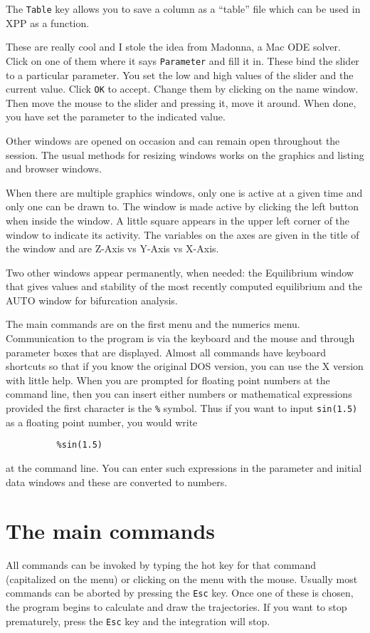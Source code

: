 \documentclass{article}
\newcommand{\bvb}{\begin{verbatim}}
\newcommand{\tcc}[1]{\addcontentsline{toc}{subsubsection}{#1}}
\begin{document}
The {\tt Table} key allows you to save a column as a ``table'' file
which can be used in XPP as a function.  

\tcc{Parameter sliders}  These are really cool and I stole the idea
from Madonna, a Mac ODE solver. Click on one of them where it says
{\tt Parameter} and fill it in.  These bind the slider to a particular
parameter.  You set the low and high values of the slider and the
current value.  Click {\tt OK} to accept. Change them by clicking on
the name window.  Then move the mouse to the slider and pressing it,
move it around.  When done, you have set the parameter to the
indicated value.


Other windows are opened on occasion and can remain open throughout the
 session.  The usual methods for resizing windows works on the graphics and
 listing and browser windows.

When there are multiple graphics windows, only one is active at a given time
 and only one can be drawn to.  The window is made active by clicking the
 left button when inside the window.  A little square appears in the upper left
 corner of the window to indicate its activity.  The variables on the
 axes are given in the title of the window and are Z-Axis vs Y-Axis vs X-Axis.  


Two other windows appear permanently, when needed: the Equilibrium window
 that gives values and stability of the most recently computed
 equilibrium and the AUTO window for bifurcation analysis.


The main commands are on the first menu and the numerics menu.  Communication 
to the program is via the keyboard and the mouse and through parameter boxes
 that are displayed.  Almost all commands have keyboard shortcuts so that if
 you know the original DOS version, you can use the X version with little help.  
When you are prompted for floating point numbers at the command line, then 
you can insert either numbers or mathematical expressions provided the first
 character is the {\tt \%} symbol. Thus if you want to input {\tt sin(1.5)} as a floating 
point number, you would write
\bvb
          %sin(1.5)
\end{verbatim}
at the command line. You can enter such expressions in the parameter and
initial data windows and these are converted to numbers.  
 

\section{The main commands}
All commands can be invoked by typing the hot key for that command (capitalized
 on the menu) or clicking on the menu with the mouse.  Usually most commands can
 be aborted by pressing the {\tt Esc} key. Once one of these is chosen, the
 program begins to calculate and draw the trajectories.  If you want to
 stop prematurely, press the {\tt Esc} key and the integration will
stop. 
\end{document}
